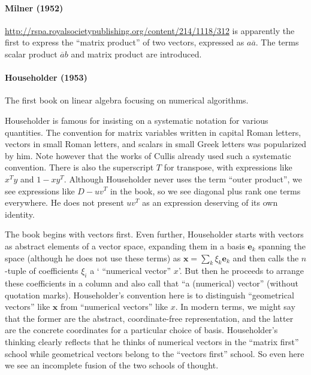 \paragraph{Milner (1952)}

\url{http://rspa.royalsocietypublishing.org/content/214/1118/312}
is apparently the first to express the ``matrix product'' of two vectors,
expressed as $a \overline{a}$.  The terms scalar product $\overline{a} b$ and
matrix product are introduced.



\paragraph{Householder (1953)~\cite{Householder1953}}

The first book on linear algebra focusing on numerical algorithms.

Householder is famous for insisting on a systematic notation for various
quantities.  The convention for matrix variables written in capital Roman
letters, vectors in small Roman letters, and scalars in small Greek letters was
popularized by him. Note however that the works of Cullis already used such a
systematic convention.
There is also the superscript $T$ for transpose, with expressions like $x^T y$
and $1 - x y^T$.  Although Householder never uses the term ``outer product'',
we see expressions like $D - u v^T$ in the book, so we see diagonal plus rank
one terms everywhere. He does not present $u v^T$ as an expression deserving of
its own identity.

The book begins with vectors first. Even further, Householder starts with
vectors as abstract elements of a vector space, expanding them in a basis
$\mathbf e_k$ spanning the space (although he does not use these terms) as
$\mathbf x = \sum_k \xi_k \mathbf e_k$ and then calls the $n$-tuple of
coefficients $\xi_i$ a ` ``numerical vector'' $x$'. But then he proceeds to
arrange these coefficients in a column and also call that ``a (numerical)
vector'' (without quotation marks).
Householder's convention here is to distinguish  ``geometrical vectors'' like
$\mathbf x$ from ``numerical vectors'' like $x$. In modern terms, we might say
that the former are the abstract, coordinate-free representation, and the
latter are the concrete coordinates for a particular choice of basis.
Householder's thinking clearly reflects that he thinks of numerical vectors in
the ``matrix first'' school while geometrical vectors belong to the ``vectors
first'' school. So even here we see an incomplete fusion of the two schools of
thought.

